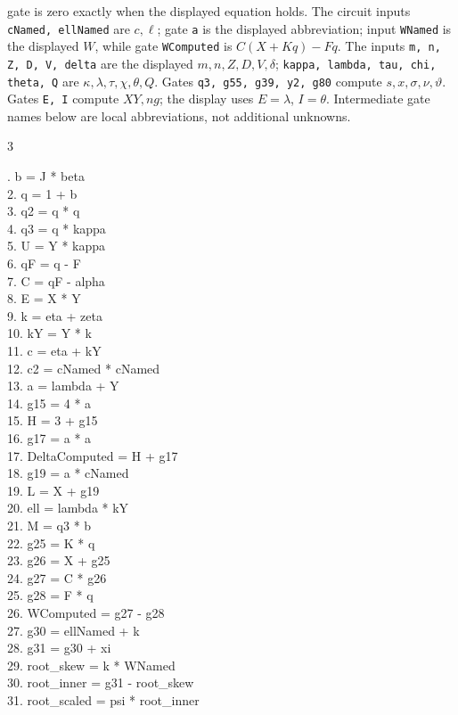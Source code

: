 \documentclass[10pt]{article}
\begin{document}
gate is zero exactly when the displayed equation holds. The circuit inputs
\texttt{cNamed, ellNamed} are $c,\ell$; gate \texttt{a} is the displayed abbreviation; input \texttt{WNamed} is the
displayed $W$, while gate \texttt{WComputed} is $C(X+Kq)-Fq$. The inputs
\texttt{m, n, Z, D, V, delta} are the displayed
$m,n,Z,D,V,\delta$; \texttt{kappa, lambda, tau, chi, theta, Q}
are $\kappa,\lambda,\tau,\chi,\theta,Q$. Gates \texttt{q3, g55, g39, y2, g80} compute $s,x,\sigma,\nu,\vartheta$. Gates \texttt{E, I} compute
$XY,ng$; the display uses $E=\lambda$, $I=\theta$. Intermediate gate
names below are local abbreviations, not additional unknowns.
\begin{multicols}{3}
\raggedright\ttfamily\fontsize{7.2}{8.4}. b = J * beta\\
2. q = 1 + b\\
3. q2 = q * q\\
4. q3 = q * kappa\\
5. U = Y * kappa\\
6. qF = q - F\\
7. C = qF - alpha\\
8. E = X * Y\\
9. k = eta + zeta\\
10. kY = Y * k\\
11. c = eta + kY\\
12. c2 = cNamed * cNamed\\
13. a = lambda + Y\\
14. g15 = 4 * a\\
15. H = 3 + g15\\
16. g17 = a * a\\
17. DeltaComputed = H + g17\\
18. g19 = a * cNamed\\
19. L = X + g19\\
20. ell = lambda * kY\\
21. M = q3 * b\\
22. g25 = K * q\\
23. g26 = X + g25\\
24. g27 = C * g26\\
25. g28 = F * q\\
26. WComputed = g27 - g28\\
27. g30 = ellNamed + k\\
28. g31 = g30 + xi\\
29. root\_skew = k * WNamed\\
30. root\_inner = g31 - root\_skew\\
31. root\_scaled = psi * root\_inner\\

\end{multicols}
\end{document}
